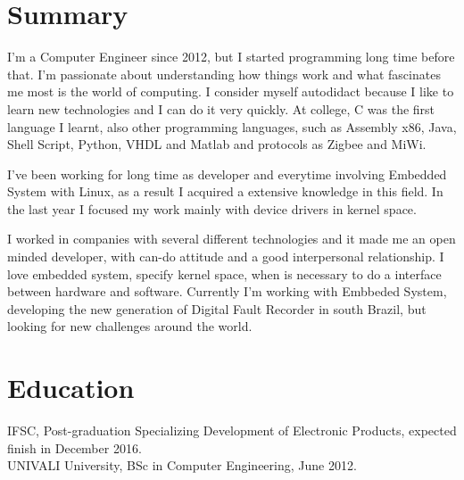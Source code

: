 \documentclass[margin]{res}
\begin{document}
\address{São José, BR \\ diogojusten@gmail.com \\ Phone: +55 (48) 9994-4758 }

\begin{resume}

\section{Summary}
I'm a Computer Engineer since 2012, but I started programming long time before that. I’m passionate about understanding how things work and what fascinates me most is
the world of computing. I consider myself autodidact because I like to learn new technologies and I can do it very quickly. At college, C was the first language I learnt, also other programming languages, such as Assembly x86, Java, Shell Script, Python, VHDL and Matlab and protocols as Zigbee and MiWi.

I've been working for long time as developer and everytime involving Embedded System with Linux, as a result I acquired a extensive knowledge in this field. In the last year I focused my work mainly with device drivers in kernel space. 

I worked in companies with several different technologies and it made me an open minded developer, with can-do attitude and a good interpersonal relationship. I love embedded system, specify kernel space, when is necessary to do a interface between hardware and software. Currently I’m working with Embbeded System, developing the new generation of Digital Fault Recorder in south Brazil, but looking for new challenges around the world.

\section{Education}
 IFSC, Post-graduation Specializing Development of Electronic Products, expected finish in December 2016.\\
 UNIVALI University, BSc in Computer Engineering, June 2012.


\end{resume}
\end{document}

